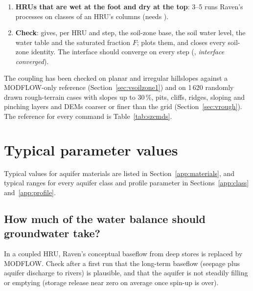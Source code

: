 \begin{enumerate}
recharge through the unsaturated zone between the soil and the water table, with its delay; on hummocky ground
 3 gives the hollows and the hummocks their own columns (Section~\ref{sec:vzclasses}). Capillary
rise from a shallow water table is then on by default. Figure~\ref{fig:szregimes} shows every position of the water
table and what carries the water in each; the coupling moves between them without any setting.
\item \textbf{HRUs that are wet at the foot and dry at the top}:  3--5 runs Raven's processes on
classes of an HRU's columns (needs ).
\item \textbf{Check}:  gives, per HRU and step, the soil-zone base, the soil water level, the water
table and the saturated fraction $F$;  plots them, and  closes every
soil-zone identity. The interface should converge on every step (, \emph{interface converged}).
\end{enumerate}
The coupling has been checked on planar and irregular hillslopes against a MODFLOW-only reference
(Section~\ref{sec:vsoilzone1}) and on 1\,620 randomly drawn rough-terrain cases with slopes up to 30\,\%, pits, cliffs,
ridges, sloping and pinching layers and DEMs coarser or finer than the grid (Section~\ref{sec:vrough}). The reference
for every command is Table~\ref{tab:szcmds}.

\section{Typical parameter values}
Typical values for aquifer materials are listed in Section~\ref{app:materials}, and typical ranges for every aquifer class
and profile parameter in Sections~\ref{app:class} and~\ref{app:profile}.

\subsection{How much of the water balance should groundwater take?}
In a coupled HRU, Raven's conceptual baseflow from deep stores is replaced by MODFLOW. Check after a first run that the
long-term baseflow (seepage plus aquifer discharge to rivers) is plausible, and that the aquifer is not steadily filling or
emptying (storage release near zero on average once spin-up is over).


